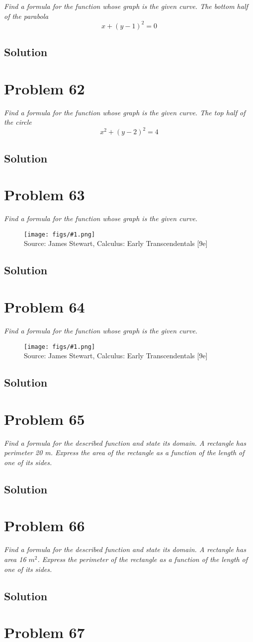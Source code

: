 \documentclass[11pt]{article}
\newcommand{\soln}{\subsection*}
\newcommand{\qn}{\textit}
\newcommand{\imagesource}[1]{{\footnotesize Source: #1}}
\newcommand{\imgqn}[1]{
	\begin{figure}[h]
		\centering
		\texttt{[image: figs/\#1.png]}\\
		\imagesource{James Stewart, Calculus: Early Transcendentals [9e]}
	\end{figure}
}
\begin{document}
\qn{Find a formula for the function whose graph is the given curve. The bottom half of the parabola $$x+(y-1)^2=0$$ }

\soln{Solution}

\section*{Problem 62}

\qn{Find a formula for the function whose graph is the given curve. The top half of the circle $$x^2+(y-2)^2=4$$}

\soln{Solution}

\section*{Problem 63}

\qn{Find a formula for the function whose graph is the given curve.}

\imgqn{1.1.63}

\soln{Solution}

\section*{Problem 64}

\qn{Find a formula for the function whose graph is the given curve.}

\imgqn{1.1.64}

\soln{Solution}

\section*{Problem 65}

\qn{Find a formula for the described function and state its domain. A rectangle has perimeter 20 m. Express the area of the rectangle as a function of the length of one of its sides.}

\soln{Solution}

\section*{Problem 66}

\qn{Find a formula for the described function and state its domain. A rectangle has area 16 $m^2$. Express the perimeter of the rectangle as a function of the length of one of its sides.}

\soln{Solution}

\section*{Problem 67}
\end{document}
